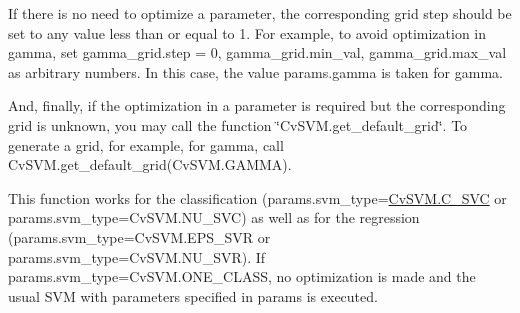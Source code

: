 If there is no need to optimize a parameter, the corresponding grid step should be set to any value less than or equal to 1. For example, to avoid optimization in {\ttfamily gamma}, set {\ttfamily gamma\+\_\+grid.\+step = 0}, {\ttfamily gamma\+\_\+grid.\+min\+\_\+val}, {\ttfamily gamma\+\_\+grid.\+max\+\_\+val} as arbitrary numbers. In this case, the value {\ttfamily params.\+gamma} is taken for {\ttfamily gamma}.

And, finally, if the optimization in a parameter is required but the corresponding grid is unknown, you may call the function \char`\"{}\+Cv\+S\+V\+M.\+get\+\_\+default\+\_\+grid\char`\"{}. To generate a grid, for example, for {\ttfamily gamma}, call {\ttfamily Cv\+S\+V\+M.\+get\+\_\+default\+\_\+grid(Cv\+S\+V\+M.\+G\+A\+M\+MA)}.

This function works for the classification ({\ttfamily params.\+svm\+\_\+type=\mbox{\hyperlink{classorg_1_1opencv_1_1ml_1_1_cv_s_v_m_a8f904304af3689654b3d7de34ae54801}{Cv\+S\+V\+M.\+C\+\_\+\+S\+VC}}} or {\ttfamily params.\+svm\+\_\+type=Cv\+S\+V\+M.\+N\+U\+\_\+\+S\+VC}) as well as for the regression ({\ttfamily params.\+svm\+\_\+type=Cv\+S\+V\+M.\+E\+P\+S\+\_\+\+S\+VR} or {\ttfamily params.\+svm\+\_\+type=Cv\+S\+V\+M.\+N\+U\+\_\+\+S\+VR}). If {\ttfamily params.\+svm\+\_\+type=Cv\+S\+V\+M.\+O\+N\+E\+\_\+\+C\+L\+A\+SS}, no optimization is made and the usual S\+VM with parameters specified in {\ttfamily params} is executed.


